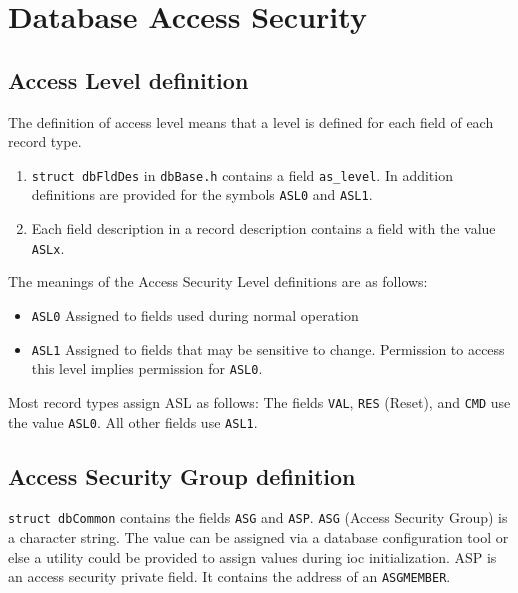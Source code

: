 \section{Database Access Security}

\subsection{Access Level definition}

The definition of access level means that a level is defined for each field of each record type.

\begin{enumerate}
\item \verb|struct dbFldDes| in \verb|dbBase.h| contains a field \verb|as_level|.
In addition definitions are provided for the symbols \verb|ASL0| and \verb|ASL1|.

\item Each field description in a record description contains a field with the value \verb|ASLx|.
\end{enumerate}

The meanings of the Access Security Level definitions are as follows:

\begin{itemize}
\item \verb|ASL0| Assigned to fields used during normal operation

\item \verb|ASL1| Assigned to fields that may be sensitive to change.
Permission to access this level implies permission for \verb|ASL0|.
\end{itemize}

Most record types assign ASL as follows:
The fields \verb|VAL|, \verb|RES| (Reset), and \verb|CMD| use the value \verb|ASL0|.
All other fields use \verb|ASL1|.

\subsection{Access Security Group definition}

\verb|struct dbCommon| contains the fields \verb|ASG| and \verb|ASP|.
\verb|ASG| (Access Security Group) is a character string.
The value can be assigned via a database configuration tool or else a utility could be provided to assign values during ioc initialization.
ASP is an access security private field.
It contains the address of an \verb|ASGMEMBER|.

